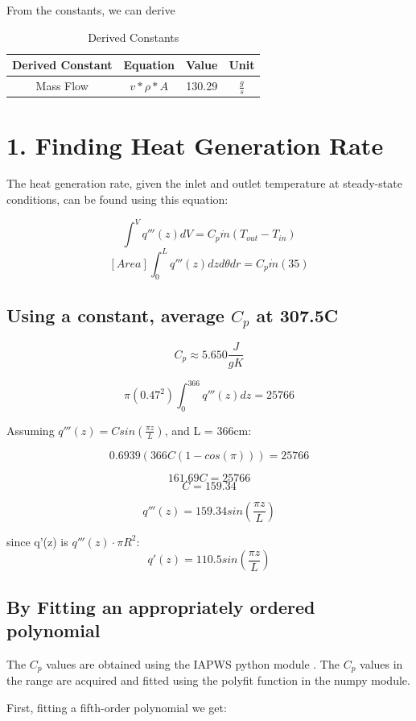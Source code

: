 \documentclass[12pt,letterpaper]{article}
\begin{document}
From the constants, we can derive
\begin{table}[h]
     \centering
    \begin{tabular}{cccc}
    \hline
       Derived Constant & Equation & Value & Unit \\
    \hline
       Mass Flow & $ v * \rho * A $ & 130.29 & $\frac{g}{s}$ \\
    \hline
    \end{tabular}
    \caption {Derived Constants}
    \label{tab:der_constants}
\end{table}



\section* {1. Finding Heat Generation Rate}

The heat generation rate, given the inlet and outlet temperature
at steady-state conditions, can be found using this equation:

\[\int^{V} q'''(z) dV = C_p \dot{m} (T_{out} - T_{in})\]
\[[Area] \int^{L}_{0} q'''(z) dz d\theta dr= C_p \dot{m} (35)\]

\subsection*{Using a constant, average $C_p$ at 307.5C}
\[C_p \approx 5.650 \frac{J}{g K}\]

\[ \pi (0.47^2)  \int^{366}_{0} q'''(z) dz = 25766\]

Assuming $q'''(z) = C sin(\frac{\pi z}{L})$,
and L = 366cm:

\[ 0.6939 (366C(1-cos(\pi))) = 25766\]

\[161.69C = 25766\]
\[C = 159.34 \]

\[q'''(z) = 159.34 sin(\frac{\pi z}{L})\]

since q'(z) is $q'''(z) \cdot \pi R^2$:
\[q'(z) = 110.5 sin(\frac{\pi z}{L})\]

\subsection*{By Fitting an appropriately ordered polynomial}

The $C_p$ values are obtained using the IAPWS python
module \cite{romera_iapws_2017}. The $C_p$ values
in the range are acquired and fitted using
the polyfit function in the numpy module.

First, fitting a fifth-order polynomial we get:
\end{document}
